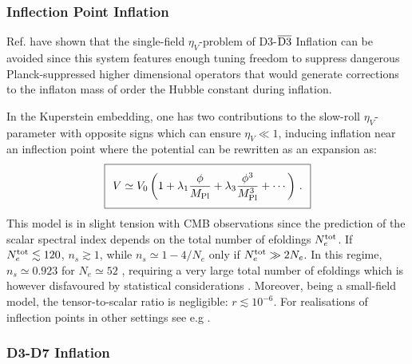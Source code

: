 \subsubsection*{Inflection Point Inflation}

Ref. \cite{Baumann:2007np,Baumann:2007ah,Krause:2007jk} have shown that the single-field $\eta_V$-problem of D3-$\overline{{\rm D3}}$ Inflation can be avoided since this system features enough tuning freedom to suppress dangerous Planck-suppressed higher dimensional operators that would generate corrections to the inflaton mass of order the Hubble constant during inflation.  

In the Kuperstein embedding, one has two contributions to the slow-roll $\eta_V$-parameter with opposite signs which can ensure $\eta_V\ll 1$, inducing inflation near an inflection point where the potential can be rewritten as an expansion as:
\begin{equation}
\setlength\fboxsep{0.25cm}
\setlength\fboxrule{0.4pt}
\boxed{
V \simeq V_0 \left(1+ \lambda_1 \frac{\phi}{M_{\rm Pl}} + \lambda_3 \frac{\phi^3}{M_{\rm Pl}^3} + \cdots \right) \, .
}
\end{equation}
This model is in slight tension with CMB observations since the prediction of the scalar spectral index depends on the total number of efoldings $N_e^{\rm tot}$. If $N_e^{\rm tot}\lesssim 120$, $n_s\gtrsim 1$, while $n_s\simeq 1-4/N_e$ only if $N_e^{\rm tot} \gg 2 N_e$. In this regime, $n_s\simeq 0.923$ for $N_e\simeq 52$ \cite{Linde:2007jn}, requiring a very large total number of efoldings which is however disfavoured by statistical considerations \cite{Agarwal:2011wm,McAllister:2012am}. Moreover, being a small-field model, the tensor-to-scalar ratio is negligible: $r\lesssim 10^{-6}$. For realisations
of inflection points in other settings see e.g \cite{Ben-Dayan:2013fva, Blanco-Pillado:2012uao, Maharana:2015saa}.


\subsubsection*{D3-D7 Inflation}

